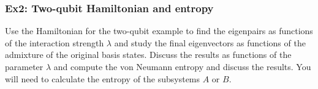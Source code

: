 \documentclass{beamer}
\begin{document}
\begin{frame}
\frametitle{Ex2: Two-qubit Hamiltonian and entropy}

Use the Hamiltonian for the two-qubit example to find the eigenpairs
as functions of the interaction strength $\lambda$ and study the final
eigenvectors as functions of the admixture of the original basis
states.  Discuss the results as functions of the parameter $\lambda$ and compute the von Neumann
entropy and discuss the results. You will need to calculate the entropy of the subsystems $A$ or $B$.
\end{frame}
\end{document}
